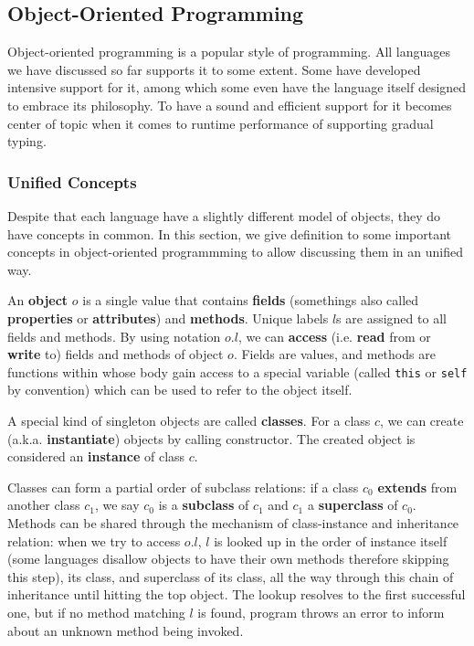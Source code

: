 \subsection{Object-Oriented Programming}

Object-oriented programming is a popular style of programming.
All languages we have discussed so far supports it to some extent.
Some have developed intensive support for it,
among which some even have the language itself designed to embrace its philosophy.
To have a sound and efficient support for it 
becomes center of topic when it comes to runtime performance of supporting gradual typing.

\subsubsection{Unified Concepts}

Despite that each language have a slightly different model of objects, they do have concepts
in common.
In this section, we give definition to some important concepts in object-oriented programmming
to allow discussing them in an unified way.

An \textbf{object} $o$ is a single value that contains \textbf{fields} (somethings also called
\textbf{properties} or \textbf{attributes}) and \textbf{methods}.
Unique labels $l$s are assigned to all fields and methods. By using notation $o.l$, we can \textbf{access}
(i.e. \textbf{read} from or \textbf{write} to) fields and methods of object $o$. 
Fields are values, and methods are functions within whose body gain access to a special variable
(called \texttt{this} or \texttt{self} by convention) which can be used to refer to the object itself.

A special kind of singleton objects are called \textbf{classes}.
For a class $c$, we can create (a.k.a. \textbf{instantiate}) objects by calling constructor.
The created object is considered an \textbf{instance} of class $c$.

Classes can form a partial order of subclass relations: if a class $c_0$ \textbf{extends} from
another class $c_1$, we say $c_0$ is a \textbf{subclass} of $c_1$ and $c_1$ a \textbf{superclass} of $c_0$.
Methods can be shared through the mechanism of class-instance and inheritance relation:
when we try to access $o.l$, $l$ is looked up in the order of instance itself (some languages disallow
objects to have their own methods therefore skipping this step), its class, and superclass of its class,
all the way through this chain of inheritance until hitting the top object.
The lookup resolves to the first successful one,
but if no method matching $l$ is found, program throws an error to inform about an unknown method being invoked.

